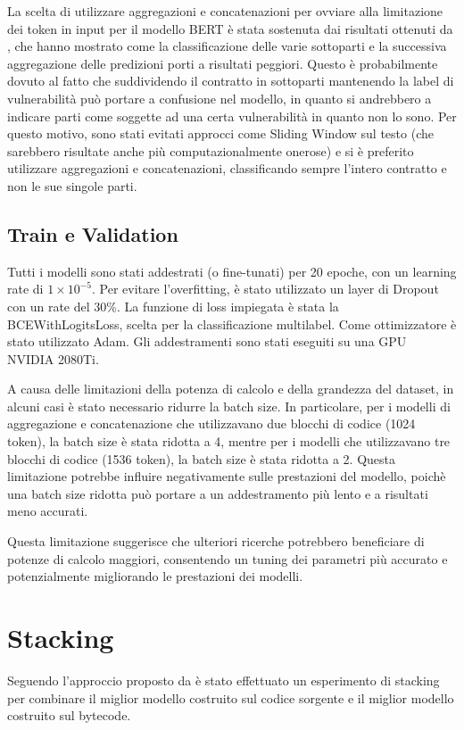 \documentclass[../../Thesis.tex]{subfiles}
\begin{document}
La scelta di utilizzare aggregazioni e concatenazioni per ovviare alla limitazione dei token in input per il modello BERT \`e stata sostenuta dai risultati ottenuti da \cite{CodeBERTPaper}, che hanno mostrato come la classificazione delle varie sottoparti e la successiva aggregazione delle predizioni porti a risultati peggiori. Questo \`e probabilmente dovuto al fatto che suddividendo il contratto in sottoparti mantenendo la label di vulnerabilit\`a pu\`o portare a confusione nel modello, in quanto si andrebbero a indicare parti come soggette ad una certa vulnerabilit\`a in quanto non lo sono. Per questo motivo, sono stati evitati approcci come Sliding Window sul testo (che sarebbero risultate anche pi\`u computazionalmente onerose) e si \`e preferito utilizzare aggregazioni e concatenazioni, classificando sempre l'intero contratto e non le sue singole parti. 

\subsection{Train e Validation}
Tutti i modelli sono stati addestrati (o fine-tunati) per 20 epoche, con un learning rate di $1 \times 10^{-5}$. Per evitare l'overfitting, \`e stato utilizzato un layer di Dropout con un rate del 30\%. La funzione di loss impiegata \`e stata la BCEWithLogitsLoss, scelta per la classificazione multilabel. Come ottimizzatore \`e stato utilizzato Adam. Gli addestramenti sono stati eseguiti su una GPU NVIDIA 2080Ti.

A causa delle limitazioni della potenza di calcolo e della grandezza del dataset, in alcuni casi \`e stato necessario ridurre la batch size. In particolare, per i modelli di aggregazione e concatenazione che utilizzavano due blocchi di codice (1024 token), la batch size \`e stata ridotta a 4, mentre per i modelli che utilizzavano tre blocchi di codice (1536 token), la batch size \`e stata ridotta a 2. Questa limitazione potrebbe influire negativamente sulle prestazioni del modello, poich\`e una batch size ridotta pu\`o portare a un addestramento pi\`u lento e a risultati meno accurati.

Questa limitazione suggerisce che ulteriori ricerche potrebbero beneficiare di potenze di calcolo maggiori, consentendo un tuning dei parametri pi\`u accurato e potenzialmente migliorando le prestazioni dei modelli.

\section{Stacking}
Seguendo l'approccio proposto da \cite{Deng} \`e stato effettuato un esperimento di stacking per combinare il miglior modello costruito sul codice sorgente e il miglior modello costruito sul bytecode.
\end{document}
